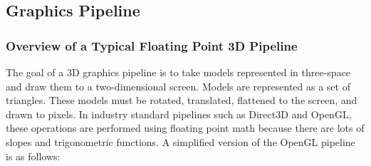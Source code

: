 \documentclass[onecolumn]{IEEEtran}
\begin{document}
\subsection{Graphics Pipeline}
\subsubsection{Overview of a Typical Floating Point 3D Pipeline}
The goal of a 3D graphics pipeline is to take models represented in three-space and draw them to a two-dimensional screen.  Models are represented as a set of triangles.  These models must be rotated, translated, flattened to the screen, and drawn to pixels.  In industry standard pipelines such as Direct3D and OpenGL, these operations are performed using floating point math because there are lots of slopes and trigonometric functions.  A simplified version of the OpenGL pipeline is as follows:
\end{document}
